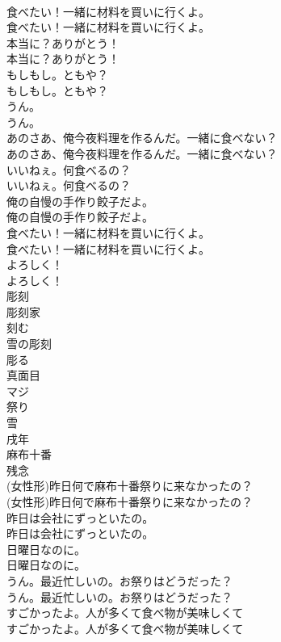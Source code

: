 \documentclass[8pt]{extreport}
\begin{document}
\begin{CJK}{UTF8}{min}
\\	食べたい！一緒に材料を買いに行くよ。	
\\	食べたい！一緒に材料を買いに行くよ。 
\\	本当に？ありがとう！	
\\	本当に？ありがとう！ 
\\	もしもし。ともや？	
\\	もしもし。ともや？ 
\\	うん。	
\\	うん。 
\\	あのさあ、俺今夜料理を作るんだ。一緒に食べない？	
\\	あのさあ、俺今夜料理を作るんだ。一緒に食べない？ 
\\	いいねぇ。何食べるの？	
\\	いいねぇ。何食べるの？ 
\\	俺の自慢の手作り餃子だよ。	
\\	俺の自慢の手作り餃子だよ。 
\\	食べたい！一緒に材料を買いに行くよ。	
\\	食べたい！一緒に材料を買いに行くよ。 
\\	よろしく！	
\\	よろしく！ 
\\	彫刻
\\	彫刻家
\\	刻む
\\	雪の彫刻
\\	彫る
\\	真面目
\\	マジ
\\	祭り
\\	雪
\\	戌年
\\	麻布十番
\\	残念
\\	(女性形)昨日何で麻布十番祭りに来なかったの？	
\\	(女性形)昨日何で麻布十番祭りに来なかったの？ 
\\	昨日は会社にずっといたの。	
\\	昨日は会社にずっといたの。 
\\	日曜日なのに。	
\\	日曜日なのに。 
\\	うん。最近忙しいの。お祭りはどうだった？	
\\	うん。最近忙しいの。お祭りはどうだった？ 
\\	すごかったよ。人が多くて食べ物が美味しくて	
\\	すごかったよ。人が多くて食べ物が美味しくて 

\end{CJK}
\end{document}
